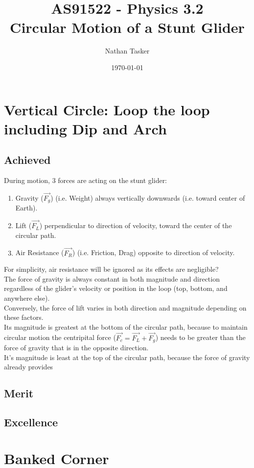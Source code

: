 \documentclass[11pt, a4paper]{article}
\title{\small AS91522 - Physics 3.2\\ \huge Circular Motion of a Stunt Glider}
\author{Nathan Tasker}
\date{\today}
\begin{document}
	\maketitle
	\tableofcontents
	\newpage
	\section{Vertical Circle: Loop the loop including Dip and Arch}
	\subsection{Achieved}
	During motion, 3 forces are acting on the stunt glider:
	\begin{enumerate}
		\item Gravity ($\vec{F_g}$) (i.e. Weight) always vertically downwards (i.e. toward center of Earth).
		\item Lift ($\vec{F_L}$) perpendicular to direction of velocity, toward the center of the circular path.
		\item Air Resistance ($\vec{F_R}$) (i.e. Friction, Drag) opposite to direction of velocity.
	\end{enumerate}
	For simplicity, air resistance will be ignored as its effects are negligible?\\
	The force of gravity is always constant in both magnitude and direction regardless of the glider's velocity or position in the loop (top, bottom, and anywhere else).\\
	Conversely, the force of lift varies in both direction and magnitude depending on these factors.\\
	Its magnitude is greatest at the bottom of the circular path, because to maintain circular motion the centripital force ($\vec{F_c}=\vec{F_L}+\vec{F_g}$) needs to be greater than the force of gravity that is in the opposite direction.\\
	It's magnitude is least at the top of the circular path, because the force of gravity already provides 
	
	\subsection{Merit}
	\subsection{Excellence}
	\section{Banked Corner}
\end{document}

